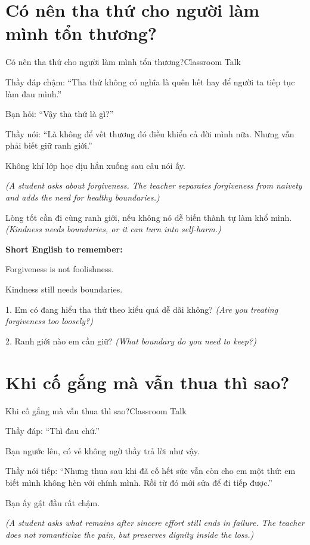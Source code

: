\section{Có nên tha thứ cho người làm mình tổn thương?}
\begin{truyen}{Có nên tha thứ cho người làm mình tổn thương?}{Classroom Talk}

Thầy đáp chậm: ``Tha thứ không có nghĩa là quên hết hay để người ta tiếp tục làm đau mình.''

Bạn hỏi: ``Vậy tha thứ là gì?''

Thầy nói: ``Là không để vết thương đó điều khiển cả đời mình nữa. Nhưng vẫn phải biết giữ ranh giới.''

Không khí lớp học dịu hẳn xuống sau câu nói ấy.

\textit{(A student asks about forgiveness. The teacher separates forgiveness from naivety and adds the need for healthy boundaries.)}
\end{truyen}

\begin{baihoc}
Lòng tốt cần đi cùng ranh giới, nếu không nó dễ biến thành tự làm khổ mình.
\textit{(Kindness needs boundaries, or it can turn into self-harm.)}
\end{baihoc}

\begin{ghinhoanh}
\textbf{Short English to remember:}

Forgiveness is not foolishness.

Kindness still needs boundaries.
\end{ghinhoanh}

\begin{tuhocnhanh}
1. Em có đang hiểu tha thứ theo kiểu quá dễ dãi không? \textit{(Are you treating forgiveness too loosely?)}

2. Ranh giới nào em cần giữ? \textit{(What boundary do you need to keep?)}
\end{tuhocnhanh}
\ngancach

\section{Khi cố gắng mà vẫn thua thì sao?}
\begin{truyen}{Khi cố gắng mà vẫn thua thì sao?}{Classroom Talk}

Thầy đáp: ``Thì đau chứ.''

Bạn ngước lên, có vẻ không ngờ thầy trả lời như vậy.

Thầy nói tiếp: ``Nhưng thua sau khi đã cố hết sức vẫn còn cho em một thứ: em biết mình không hèn với chính mình. Rồi từ đó mới sửa để đi tiếp được.''

Bạn ấy gật đầu rất chậm.

\textit{(A student asks what remains after sincere effort still ends in failure. The teacher does not romanticize the pain, but preserves dignity inside the loss.)}
\end{truyen}

